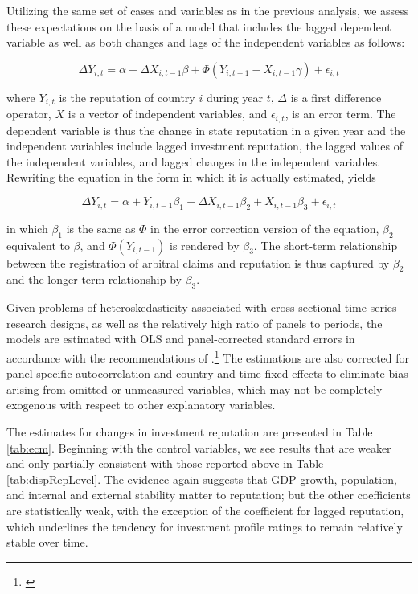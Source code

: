 \documentclass[12pt,onesided]{amsart}
\begin{document}
Utilizing the same set of cases and variables as in the previous analysis, we assess these expectations on the basis of a model that includes the lagged dependent variable as well as both changes and lags of the independent variables as follows:

\begin{equation}
\Delta Y_{i,t} = \alpha + \Delta X_{i,t-1} \beta + \Phi(Y_{i,t-1} - X_{i,t-1} \gamma) + \epsilon_{i,t}
\end{equation}

where $Y_{i,t}$ is the reputation of country $i$ during year $t$, $\Delta$ is a first difference operator, $X$ is a vector of independent variables, and $\epsilon_{i,t}$, is an error term. The dependent variable is thus the change in state reputation in a given year and the independent variables include lagged investment reputation, the lagged values of the independent variables, and lagged changes in the independent variables. Rewriting the equation in the form in which it is actually estimated, yields

\begin{equation}
\Delta Y_{i,t} = \alpha + Y_{i,t-1} \beta_{1} + \Delta X_{i,t-1} \beta_{2} + X_{i, t-1} \beta_{3} + \epsilon_{i,t}
\end{equation}

in which $\beta_{1}$ is the same as $\Phi$ in the error correction version of the equation, $\beta_{2}$ equivalent to $\beta$, and $\Phi(Y_{i,t-1})$ is rendered by $\beta_{3}$. The short-term relationship between the registration of arbitral claims and reputation is thus captured by $\beta_{2}$  and the longer-term relationship by $\beta_{3}$.

Given problems of heteroskedasticity associated with cross-sectional time series research designs, as well as the relatively high ratio of panels to periods, the models are estimated with OLS and panel-corrected standard errors in accordance with the recommendations of \citeauthor{beck:katz:1995}.\footnote{\citet{beck:katz:1995}} The estimations are also corrected for panel-specific autocorrelation and country and time fixed effects to eliminate bias arising from omitted or unmeasured variables, which may not be completely exogenous with respect to other explanatory variables.

The estimates for changes in investment reputation are presented in Table \ref{tab:ecm}. Beginning with the control variables, we see results that are weaker and only partially consistent with those reported above in Table \ref{tab:dispRepLevel}. The evidence again suggests that GDP growth, population, and internal and external stability matter to reputation; but the other coefficients are statistically weak, with the exception of the coefficient for lagged reputation, which underlines the tendency for investment profile ratings to remain relatively stable over time. 
\end{document}
